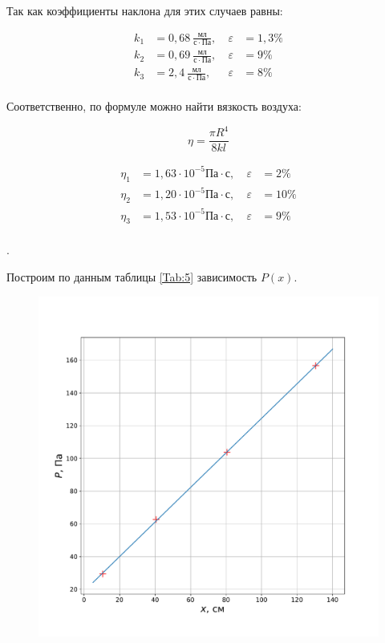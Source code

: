 \documentclass[a4paper, 12pt]{article}
\newcommand{\eps}{\varepsilon}
\newcounter{Points}
\newcommand{\point}{\arabic{Points}. \addtocounter{Points}{1}}
\begin{document}
Так как коэффициенты наклона для этих случаев равны:

\[
\begin{aligned}
    k_1 &= 0,68 ~\frac{мл}{с \cdot Па},&~ \eps &= 1,3\% \\
    k_2 &= 0,69 ~\frac{мл}{с \cdot Па},&~ \eps &=   9\% \\
    k_3 &= 2,4  ~\frac{мл}{с \cdot Па},&~ \eps &=   8\% \\
\end{aligned}    
\]

Соответственно, по формуле можно найти вязкость воздуха:

\[
    \eta = \frac{\pi R^4}{8kl}
\]

\[
\begin{aligned}
    \eta_1 &= 1,63 \cdot 10^{-5} Па \cdot с,&~ \eps &=  2\% \\
    \eta_2 &= 1,20 \cdot 10^{-5} Па \cdot с,&~ \eps &= 10\% \\
    \eta_3 &= 1,53 \cdot 10^{-5} Па \cdot с,&~ \eps &=  9\% \\
\end{aligned}    
\]


\point Построим по данным таблицы \ref{Tab:5} зависимость $P(x)$.

\begin{figure}[!h]
    \centering
    \includegraphics[scale = 0.4]{Px.pdf}
\end{figure}
\end{document}
